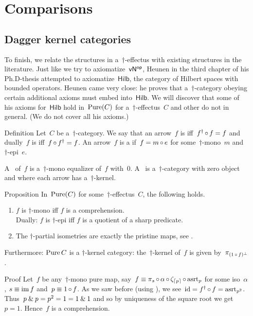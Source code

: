 \documentclass[b]{subfiles}
\begin{document}
\section{Comparisons}
\subsection{Dagger kernel categories}
\begin{parsec}%
\begin{point}%
To finish, we relate the structures in a~$\dagger$-effectus
    with existing structures in the literature.
Just like we try to axiomatize~${\mathsf{vN}}{^{\mathsf{op}}}$,
    Heunen in the third chapter of his Ph.D-thesis attempted
    to axiomatize~$\mathsf{Hilb}$,
    the category of Hilbert spaces with bounded operators.
Heunen came very close:
    he proves that a~$\dagger$-category obeying
    certain additional axioms must embed into~$\mathsf{Hilb}$.
    \cite[3.7.18]{heunenphd}
We will discover that some of his axioms for~$\mathsf{Hilb}$
    hold in~$\operatorname{Pure}(C)$ for a~$\dagger$-effectus~$C$
    and other do not in general.
(We do not cover all his axioms.)
\end{point}
\begin{point}{Definition}%
Let~$C$ be a~$\dagger$-category.
We say that an arrow~$f$
    is 
    iff~$f^\dagger \mathop{\circ} f = f$
    and dually~$f$ is 
    iff~$f\mathop{\circ} f^\dagger = f$.
An arrow~$f$ is a 
    if~$f = m \mathop{\circ} e$
    for some~$\dagger$-mono~$m$
    and~$\dagger$-epi~$e$.

A~ of~$f$
is a~$\dagger$-mono equalizer of~$f$ with~$0$.
A~ is a~$\dagger$-category
    with zero object and where each arrow has a~$\dagger$-kernel.
\cite[3.2.20]{heunenphd}
\end{point}
\begin{point}{Proposition}%
In~$\operatorname{Pure}(C)$ for some~$\dagger$-effectus~$C$,
    the following holds.
\begin{enumerate}
\item
    $f$ is $\dagger$-mono iff $f$ is a comprehension. \\
    Dually:
    $f$ is $\dagger$-epi iff $f$ is a quotient of a sharp predicate.
\item
    The $\dagger$-partial isometries are exactly the pristine maps, see .
\end{enumerate}
Furthermore: $\operatorname{Pure} C$ is a $\dagger$-kernel category:
    the~$\dagger$-kernel of~$f$ is given by~$\pi_{(1 \mathop{\circ} f)^\perp}$.
\begin{point}{Proof}%
Let~$f$ be any~$\dagger$-mono
pure map, say~$f \equiv \pi_s \mathop{\circ} \alpha \mathop{\circ} \zeta_{\left\lceil p\right\rceil}
        \mathop{\circ} \mathrm{asrt}_p$
        for some iso~$\alpha$, $s \equiv \operatorname{im} f$ and~$p \equiv 1 \mathop{\circ} f$.
As we saw before (using ),
    we see~$\operatorname{id} = f^\dagger \mathop{\circ} f = \mathrm{asrt}_{p^2}$.
Thus~$p \mathbin{\&} p = p^2 =  1 = 1 \mathbin{\&} 1$
    and so by uniqueness of the square root
    we get~$p = 1$.
Hence~$f$ is a comprehension.


\end{point}
\end{point}
\end{parsec}
\end{document}
